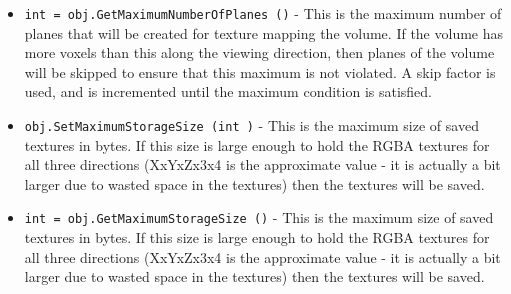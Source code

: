 \begin{itemize}
\item  \verb|int = obj.GetMaximumNumberOfPlanes ()| -  This is the maximum number of planes that will be created for texture mapping
 the volume. If the volume has more voxels than this along the viewing direction,
 then planes of the volume will be skipped to ensure that this maximum is not
 violated. A skip factor is used, and is incremented until the maximum condition
 is satisfied.

\item  \verb|obj.SetMaximumStorageSize (int )| -  This is the maximum size of saved textures in bytes. If this size is large
 enough to hold the RGBA textures for all three directions (XxYxZx3x4 is
 the approximate value - it is actually a bit larger due to wasted space in
 the textures) then the textures will be saved.

\item  \verb|int = obj.GetMaximumStorageSize ()| -  This is the maximum size of saved textures in bytes. If this size is large
 enough to hold the RGBA textures for all three directions (XxYxZx3x4 is
 the approximate value - it is actually a bit larger due to wasted space in
 the textures) then the textures will be saved.

\end{itemize}

